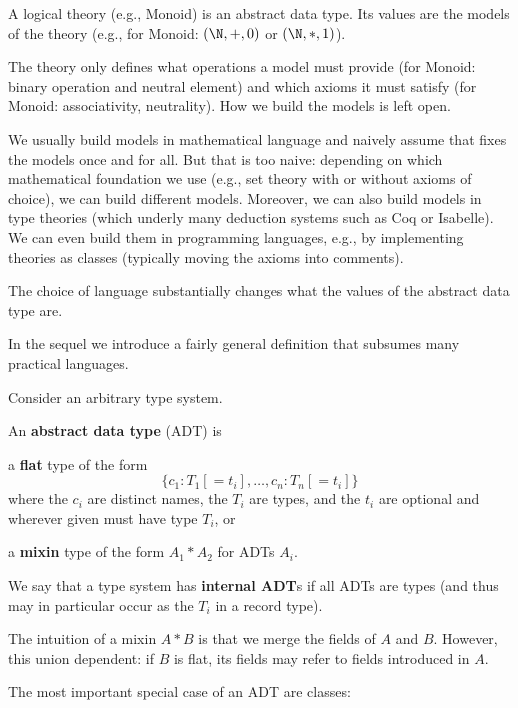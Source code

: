 \begin{example}[Theories]
A logical theory (e.g., Monoid) is an abstract data type.
Its values are the models of the theory (e.g., for Monoid: $(\N,+,0)$ or $(\N,*,1)$).

The theory only defines what operations a model must provide (for Monoid: binary operation and neutral element) and which axioms it must satisfy (for Monoid: associativity, neutrality).
How we build the models is left open.

We usually build models in mathematical language and naively assume that fixes the models once and for all.
But that is too naive: depending on which mathematical foundation we use (e.g., set theory with or without axioms of choice), we can build different models.
Moreover, we can also build models in type theories (which underly many deduction systems such as Coq or Isabelle).
We can even build them in programming languages, e.g., by implementing theories as classes (typically moving the axioms into comments).

The choice of language substantially changes what the values of the abstract data type are.
\end{example}

In the sequel we introduce a fairly general definition that subsumes many practical languages.

\begin{definition}
Consider an arbitrary type system.

An \textbf{abstract data type} (ADT) is
\begin{compactitem}
\item a \textbf{flat} type of the form
  \[\{c_1:T_1[=t_i],\ldots,c_n:T_n[=t_i]\}\]
  where the $c_i$ are distinct names, the $T_i$ are types, and the $t_i$ are optional and wherever given must have type $T_i$, or
\item a \textbf{mixin} type of the form $A_1*A_2$ for ADTs $A_i$.
\end{compactitem}

We say that a type system has \textbf{internal ADT}s if all ADTs are types (and thus may in particular occur as the $T_i$ in a record type).
\end{definition}

The intuition of a mixin $A*B$ is that we merge the fields of $A$ and $B$.
However, this union dependent: if $B$ is flat, its fields may refer to fields introduced in $A$.

The most important special case of an ADT are classes:


